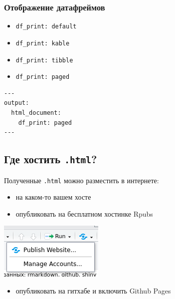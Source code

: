 \documentclass[
]{book}
\providecommand{\tightlist}{%
  \setlength{\itemsep}{0pt}\setlength{\parskip}{0pt}}
\begin{document}
\hypertarget{ux43eux442ux43eux431ux440ux430ux436ux435ux43dux438ux435-ux434ux430ux442ux430ux444ux440ux435ux439ux43cux43eux432}{%
\subsubsection{Отображение датафреймов}\label{ux43eux442ux43eux431ux440ux430ux436ux435ux43dux438ux435-ux434ux430ux442ux430ux444ux440ux435ux439ux43cux43eux432}}

\begin{itemize}
\tightlist
\item
  \texttt{df\_print:\ default}
\item
  \texttt{df\_print:\ kable}
\item
  \texttt{df\_print:\ tibble}
\item
  \texttt{df\_print:\ paged}
\end{itemize}

\begin{verbatim}
---
output:
  html_document:
    df_print: paged
---
\end{verbatim}

\hypertarget{ux433ux434ux435-ux445ux43eux441ux442ux438ux442ux44c-.html}{%
\subsection{\texorpdfstring{Где хостить \texttt{.html}?}{Где хостить .html?}}\label{ux433ux434ux435-ux445ux43eux441ux442ux438ux442ux44c-.html}}

Полученные \texttt{.html} можно разместить в интернете:

\begin{itemize}
\item
  на каком-то вашем хосте
\item
  опубликовать на бесплатном хостинке Rpubs
\end{itemize}

\includegraphics{images/7.02_publish_rpubs.png}

\begin{itemize}
\tightlist
\item
  опубликовать на гитхабе и включить Github Pages
\end{itemize}
\end{document}

